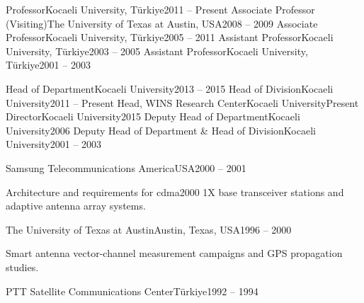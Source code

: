 
\begin{cventries}
    {Professor}{Kocaeli University, Türkiye}{2011 -- Present}{}
    {Associate Professor (Visiting)}{The University of Texas at Austin, USA}{2008 -- 2009}{}
    {Associate Professor}{Kocaeli University, Türkiye}{2005 -- 2011}{}
    {Assistant Professor}{Kocaeli University, Türkiye}{2003 -- 2005}{}
    {Assistant Professor}{Kocaeli University, Türkiye}{2001 -- 2003}{}
\end{cventries}


\begin{cventries}
    {Head of Department}{Kocaeli University}{2013 -- 2015}{}
    {Head of Division}{Kocaeli University}{2011 -- Present}{}
    {Head, WINS Research Center}{Kocaeli University}{Present}{}
    {Director}{Kocaeli University}{2015}{}
    {Deputy Head of Department}{Kocaeli University}{2006}{}
    {Deputy Head of Department \& Head of Division}{Kocaeli University}{2001 -- 2003}{}
\end{cventries}


\begin{cventries}
    {Samsung Telecommunications America}{USA}{2000 -- 2001}
    {\begin{cvitems}
       \item Architecture and requirements for cdma2000 1X base transceiver stations and adaptive antenna array systems.
     \end{cvitems}}
    {The University of Texas at Austin}{Austin, Texas, USA}{1996 -- 2000}
    {\begin{cvitems}
       \item Smart antenna vector-channel measurement campaigns and GPS propagation studies.
     \end{cvitems}}
    {PTT Satellite Communications Center}{Türkiye}{1992 -- 1994}{}
\end{cventries}

